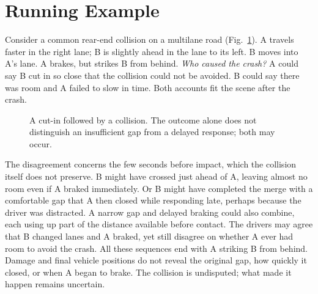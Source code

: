 \section{Running Example}
\label{sec:running-example}

Consider a common rear-end collision on a multilane road
(Fig.~\ref{fig:cut-in-example}). A travels faster in the right lane; B is
slightly ahead in the lane to its left. B moves into A's lane. A brakes,
but strikes B from behind. \emph{Who caused the crash?} A could say B cut in
so close that the collision could not be avoided. B could say there was
room and A failed to slow in time. Both accounts fit the scene after the crash.
%
\begin{figure}[!b]
  \centering
  
  \caption{A cut-in followed by a collision. The outcome alone does not
  distinguish an insufficient gap from a delayed response; both may occur.}
  \label{fig:cut-in-example}
\end{figure}
%
The disagreement concerns the few seconds before impact, which the collision
itself does not preserve. B might have crossed just ahead of A, leaving
almost no room even if A braked immediately. Or B might have completed the
merge with a comfortable gap that A then closed while responding late,
perhaps because the driver was distracted. A narrow gap and delayed braking
could also combine, each using up part of the distance available before
contact. The drivers may agree that B changed lanes and A braked, yet still
disagree on whether A ever had room to avoid the crash. All these sequences
end with A striking B from behind. Damage and final vehicle positions do
not reveal the original gap, how quickly it closed, or when A began to brake.
The collision is undisputed; what made it happen remains uncertain.
